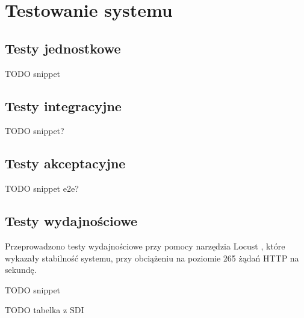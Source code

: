 \clearpage %

\section{Testowanie systemu}

\subsection{Testy jednostkowe}

TODO snippet

\subsection{Testy integracyjne}

TODO snippet?

\subsection{Testy akceptacyjne}

TODO snippet e2e?

\subsection{Testy wydajnościowe}

Przeprowadzono testy wydajnościowe przy pomocy narzędzia Locust \cite{locust}, które wykazały stabilność systemu, przy obciążeniu na poziomie 265 żądań HTTP na sekundę.

TODO snippet

TODO tabelka z SDI